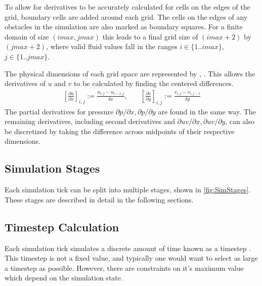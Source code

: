 To allow for derivatives to be accurately calculated for cells on the edges of the grid, boundary cells are added around each grid.%
The cells on the edges of any obstacles in the simulation are also marked as boundary squares.
For a finite domain of size $(imax, jmax)$ this leads to a final grid size of $(imax + 2)$ by $(jmax + 2)$, where valid fluid values fall in the ranges %
$i \in \{1..imax\}$, $j \in \{1..jmax\}$.

The physical dimensions of each grid space are represented by \deltaX{}, \deltaY{}.
This allows the derivatives of $u$ and $v$ to be calculated by finding the centered differences.
\begin{align}
    \left[\frac{\partial{u}}{\partial{x}}\right]_{i,j} := \frac{u_{i,j}-u_{i-1,j}}{\delta{x}}, 
    & \quad %
    \left[\frac{\partial{v}}{\partial{y}}\right]_{i,j} := \frac{v_{i,j}-v_{i,j-1}}{\delta{y}}
\end{align}
The partial derivatives for pressure $\partial{p}/\partial{x}, \partial{p}/\partial{y}$ are found in the same way.
The remaining derivatives, including second derivatives and $\partial{uv}/\partial{x}, \partial{uv}/\partial{y}$, can also be discretized by taking the difference across midpoints of their respective dimensions\cite{hirt1976}.
%

\subsection{Simulation Stages}

Each simulation tick can be split into multiple stages, shown in \cref{fig:SimStages}.
These stages are described in detail in the following sections.

\subsection{Timestep Calculation}
\label{sec:TimestepCalculation}
Each simulation tick simulates a discrete amount of time known as a timestep \deltaT{}.
This timestep is not a fixed value, and typically one would want to select as large a timestep as possible.
However, there are constraints on it's maximum value which depend on the simulation state.

